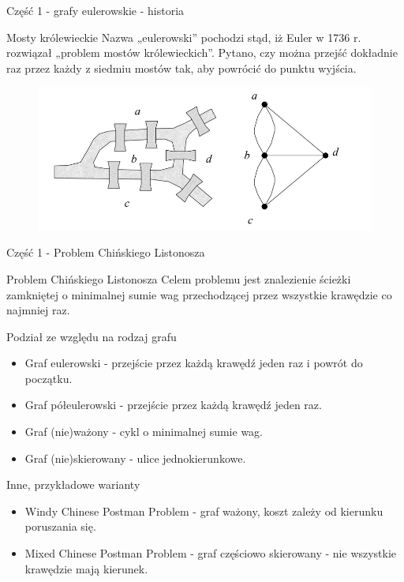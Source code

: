 \documentclass[polish,envcountsect,10pt]{beamer}
\begin{document}
\begin{frame}{Część 1 - grafy eulerowskie - historia}
    \begin{block}{Mosty królewieckie}
        Nazwa „eulerowski” pochodzi stąd, iż Euler w 1736 r. rozwiązał „problem
        mostów królewieckich”. Pytano, czy można przejść dokładnie raz przez
        każdy z siedmiu mostów tak, aby powrócić do punktu wyjścia.
    \end{block}
    \begin{figure}
        \centering
        \includegraphics[width=0.7\linewidth]{./zal_a.png}
    \end{figure}
\end{frame}

\begin{frame}{Część 1 - Problem Chińskiego Listonosza}
    \begin{block}{Problem Chińskiego Listonosza}
        Celem problemu jest znalezienie ścieżki zamkniętej o minimalnej sumie wag przechodzącej przez wszystkie krawędzie co najmniej raz.
    \end{block}
    \begin{block}{Podział ze względu na rodzaj grafu}
        \begin{itemize}
            \item Graf eulerowski - przejście przez każdą krawędź jeden raz i powrót do początku.
            \item Graf półeulerowski - przejście przez każdą krawędź jeden raz.
            \item Graf (nie)ważony - cykl o minimalnej sumie wag.
            \item Graf (nie)skierowany - ulice jednokierunkowe.
        \end{itemize}
    \end{block}
    \begin{block}{Inne, przykładowe warianty}
        \begin{itemize}
            \item Windy Chinese Postman Problem - graf ważony, koszt zależy od kierunku poruszania się.
            \item Mixed Chinese Postman Problem - graf częściowo skierowany - nie wszystkie krawędzie mają kierunek.
        \end{itemize}
    \end{block}
\end{frame}
\end{document}
